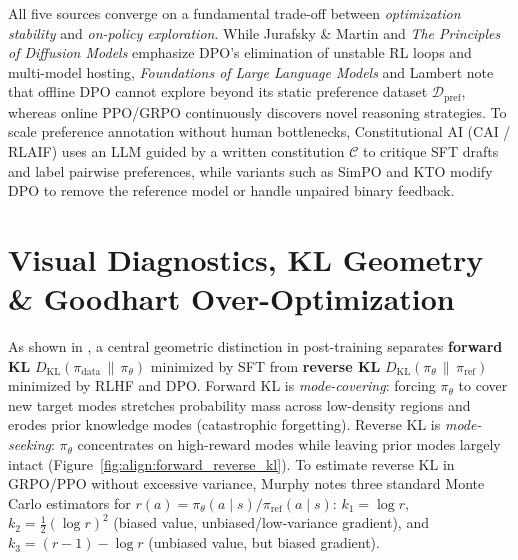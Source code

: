 \documentclass[../../../../master.tex]{subfiles}
\begin{document}
\begin{crossbook}
\label{sec:align:crossbook_synth}
All five sources converge on a fundamental trade-off between \emph{optimization stability} and \emph{on-policy exploration}. While Jurafsky \& Martin  and \emph{The Principles of Diffusion Models}  emphasize DPO's elimination of unstable RL loops and multi-model hosting, \emph{Foundations of Large Language Models}  and Lambert  note that offline DPO cannot explore beyond its static preference dataset $\mathcal{D}_{\mathrm{pref}}$, whereas online PPO/GRPO continuously discovers novel reasoning strategies. To scale preference annotation without human bottlenecks, Constitutional AI (CAI / RLAIF)   uses an LLM guided by a written constitution $\mathcal{C}$ to critique SFT drafts and label pairwise preferences, while variants such as SimPO and KTO modify DPO to remove the reference model or handle unpaired binary feedback.
\end{crossbook}

\section{Visual Diagnostics, KL Geometry \& Goodhart Over-Optimization}
\label{sec:align:diagnostics}

As shown in , a central geometric distinction in post-training separates \textbf{forward KL} $D_{\mathrm{KL}}(\pi_{\mathrm{data}} \,\|\, \pi_\theta)$ minimized by SFT from \textbf{reverse KL} $D_{\mathrm{KL}}(\pi_\theta \,\|\, \pi_{\mathrm{ref}})$ minimized by RLHF and DPO. Forward KL is \emph{mode-covering}: forcing $\pi_\theta$ to cover new target modes stretches probability mass across low-density regions and erodes prior knowledge modes (catastrophic forgetting). Reverse KL is \emph{mode-seeking}: $\pi_\theta$ concentrates on high-reward modes while leaving prior modes largely intact (Figure~\ref{fig:align:forward_reverse_kl}). To estimate reverse KL in GRPO/PPO without excessive variance, Murphy  notes three standard Monte Carlo estimators for $r(a) = \pi_\theta(a \mid s)/\pi_{\mathrm{ref}}(a \mid s)$: $k_1 = \log r$, $k_2 = \frac{1}{2}(\log r)^2$ (biased value, unbiased/low-variance gradient), and $k_3 = (r - 1) - \log r$ (unbiased value, but biased gradient).
\end{document}
